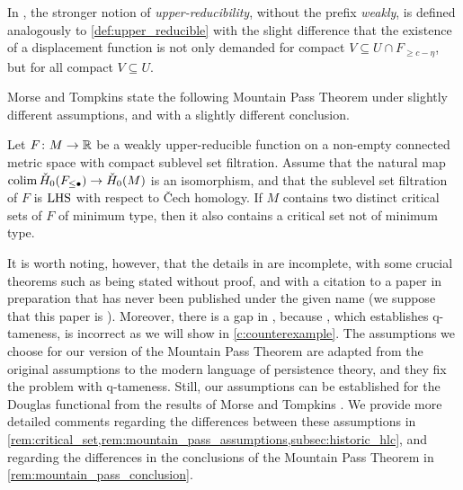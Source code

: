 In \cite[p.~36]{Morse.1938}, the stronger notion of \emph{upper-reducibility}, without the prefix \emph{weakly}, is defined analogously to \cref{def:upper_reducible} with the slight difference that the existence of a displacement function is not only demanded for compact $V \subseteq U \cap F_{\geq c - \eta}$, but for all compact $V \subseteq U$.

Morse and Tompkins state the following Mountain Pass Theorem under slightly different assumptions, and with a slightly different conclusion.


\begin{thm}
\label{thm:mountain_pass}
	Let $F \colon M \to \mathbb{R}$ be a weakly upper-reducible function on a non-empty connected metric space with compact sublevel set filtration.
	Assume that the natural map $\operatorname*{colim} \check{H}_0(F_{\leq \bullet}) \to \check{H}_0(M)$ is an isomorphism, and that the sublevel set filtration of $F$ is $\mathrm{LHS}$ with respect to \v Cech homology.
	If $M$ contains two distinct critical sets of $F$ of minimum type, then it also contains a critical set not of minimum type.
\end{thm}

It is worth noting, however, that the details in \cite{Morse.1939} are incomplete, with some crucial theorems such as \cite[Theorems 7.3 and 7.4, Corollary 7.1]{Morse.1939} being stated without proof, and with a citation to a paper in preparation that has never been published under the given name (we suppose that this paper is \cite{Morse.1940}).
Moreover, there is a gap in \cite{Morse.1940}, because \cite[Theorem 6.3]{Morse.1940}, which establishes q-tameness, is incorrect as we will show in \cref{c:counterexample}.
The assumptions we choose for our version of the Mountain Pass Theorem are adapted from the original assumptions to the modern language of persistence theory, and they fix the problem with q-tameness.
Still, our assumptions can be established for the Douglas functional from the results of Morse and Tompkins \cite{Morse.1939}.
We provide more detailed comments regarding the differences between these assumptions in \cref{rem:critical_set,rem:mountain_pass_assumptions,subsec:historic_hlc}, and regarding the differences in the conclusions of the Mountain Pass Theorem in \cref{rem:mountain_pass_conclusion}.

